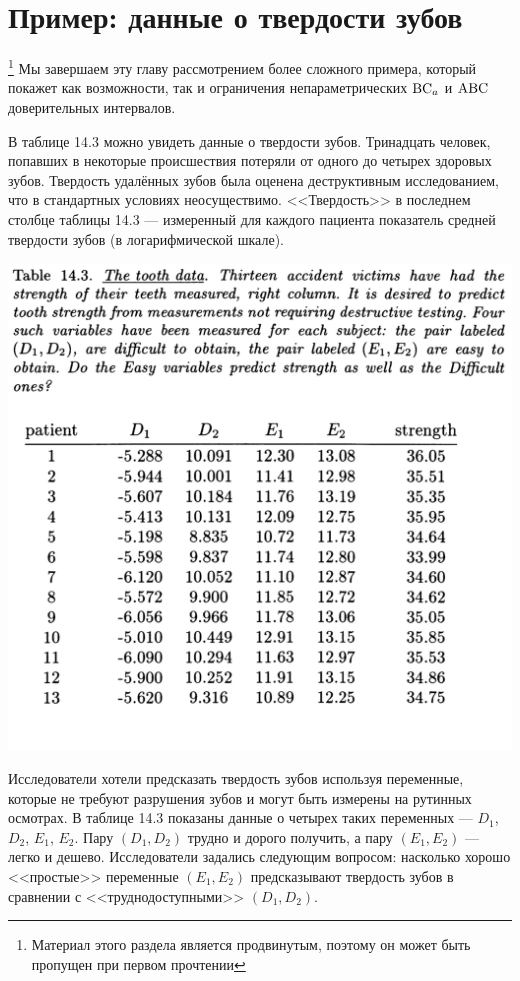 \section{Пример: данные о твердости зубов}

\footnote{Материал этого раздела является продвинутым, поэтому он может быть пропущен при первом прочтении}
Мы завершаем эту главу рассмотрением более сложного примера, который покажет как возможности, так и ограничения непараметрических $\mathrm{BC}_a$ и $\mathrm{ABC}$ доверительных интервалов.

В таблице 14.3 можно увидеть данные о твердости зубов. Тринадцать человек, попавших в некоторые происшествия потеряли от одного до четырех здоровых зубов. Твердость удалённых зубов была оценена деструктивным исследованием, что в стандартных условиях неосуществимо. <<Твердость>> в последнем столбце таблицы 14.3 --- измеренный для каждого пациента показатель средней твердости зубов (в логарифмической шкале).

\noindent
\begin{center}
\includegraphics[width=0.9\linewidth]{14/t143.png}
\end{center}
\setcounter{table}{3}

Исследователи хотели предсказать твердость зубов используя переменные, которые не требуют разрушения зубов и могут быть измерены на рутинных осмотрах. В таблице 14.3 показаны данные о четырех таких переменных --- $D_1$, $D_2$, $E_1$, $E_2$. Пару $(D_1, D_2)$ трудно и дорого получить, а пару $(E_1, E_2)$ --- легко и дешево. Исследователи задались следующим вопросом: насколько хорошо <<простые>> переменные $(E_1, E_2)$ предсказывают твердость зубов в сравнении с <<труднодоступными>> $(D_1, D_2)$.

